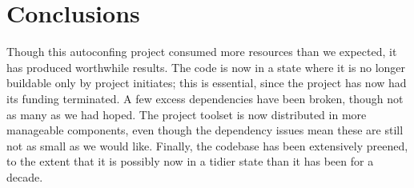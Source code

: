 \documentclass{speauth}
\begin{document}
\section{Conclusions}

Though this autoconfing project consumed more resources than we
expected, it has produced worthwhile results.  The code is now in a
state where it is no longer buildable only by project initiates; this
is essential, since the project has now had its funding terminated.  A
few excess dependencies have been broken, though not as many as we had hoped.
The project toolset is now distributed in more manageable components,
even though the dependency issues mean these are still not as small as
we would like.  Finally, the codebase has been extensively preened, to the
extent that it is possibly now in a tidier state than it has been for
a decade.











\end{document}
